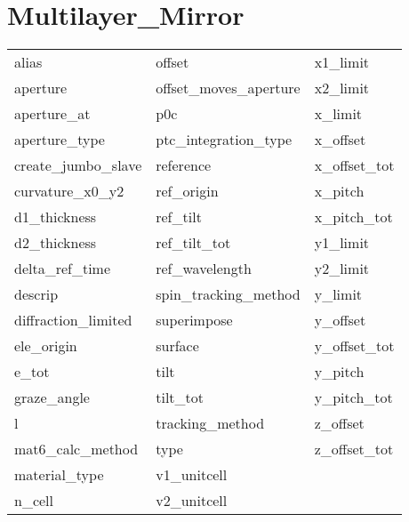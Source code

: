  \section{Multilayer_Mirror}
 \label{s:list.multilayer.mirror}
 
 \begin{tabular}{lll} \toprule
alias                       & offset                      & x1_limit                    \\
aperture                    & offset_moves_aperture       & x2_limit                    \\
aperture_at                 & p0c                         & x_limit                     \\
aperture_type               & ptc_integration_type        & x_offset                    \\
create_jumbo_slave          & reference                   & x_offset_tot                \\
curvature_x0_y2             & ref_origin                  & x_pitch                     \\
d1_thickness                & ref_tilt                    & x_pitch_tot                 \\
d2_thickness                & ref_tilt_tot                & y1_limit                    \\
delta_ref_time              & ref_wavelength              & y2_limit                    \\
descrip                     & spin_tracking_method        & y_limit                     \\
diffraction_limited         & superimpose                 & y_offset                    \\
ele_origin                  & surface                     & y_offset_tot                \\
e_tot                       & tilt                        & y_pitch                     \\
graze_angle                 & tilt_tot                    & y_pitch_tot                 \\
l                           & tracking_method             & z_offset                    \\
mat6_calc_method            & type                        & z_offset_tot                \\
material_type               & v1_unitcell                 &                             \\
n_cell                      & v2_unitcell                 &                             \\
 \bottomrule
 \end{tabular}
 \vfill
 
